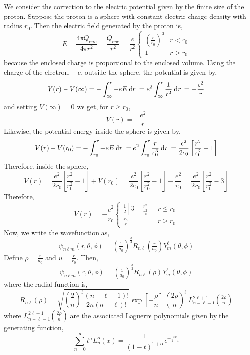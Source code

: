 \documentclass[12pt]{extarticle}
\begin{document}
We consider the correction to the electric potential given by the finite size of the proton. Suppose the proton is a sphere with constant electric charge density with radius $r_0$. Then the electric field generated by the proton is,
\[E = \frac{4 \pi Q_{enc}}{4 \pi r^2} = \frac{Q_{enc}}{r^2} = \frac{e}{r^2}
\begin{cases}
\left(\frac{r}{r_0} \right)^3 & r < r_0 \\
1 & r > r_0
\end{cases}\]
because the enclosed charge is proportional to the enclosed volume. Using the charge of the electron, $-e$, outside the sphere, the potential is given by,
\[ V(r) - V(\infty) = - \int_{\infty}^{r} -e E \: \mathrm{d}r \: = e^2 \int_{\infty}^r \frac{1}{r^2} \: \mathrm{d}r \: = - \frac{e^2}{r}\]
and setting $V(\infty) = 0$ we get, for $r \ge r_0$,
\[V(r) = - \frac{e^2}{r}\]
Likewise, the potential energy inside the sphere is given by,
\[V(r) - V(r_0) = - \int_{r_0}^{r} -e E \: \mathrm{d}r \: = e^2 \int_{r_0}^r \frac{r}{r_0^3} \: \mathrm{d}r \: = \frac{e^2}{2r_0} \left[\frac{r^2}{r_0^2} - 1 \right] \]
Therefore, inside the sphere, 
\[ V(r) = \frac{e^2}{2r_0} \left[\frac{r^2}{r_0^2} - 1 \right] + V(r_0) = \frac{e^2}{2r_0} \left[\frac{r^2}{r_0^2} - 1 \right]  - \frac{e^2}{r_0} = \frac{e^2}{2r_0} \left[\frac{r^2}{r_0^2} - 3 \right] \]
Therefore,
\[V(r) = - \frac{e^2}{r_0}
\begin{cases}
\frac{1}{2} \left[3 - \frac{r^2}{r_0^2} \right] & r \le r_0 \\
\frac{r_0}{r} & r \ge r_0
\end{cases}\]
Now, we write the wavefunction as,
\[ \psi_{n \ell m}(r, \theta, \phi) = \left(\tfrac{1}{a_0} \right)^{\frac{3}{2}} R_{n \ell}\left(\tfrac{r}{a_0} \right) Y^{\ell}_m (\theta, \phi) \]
Define $\rho = \frac{r}{a_0}$ and $u = \frac{r}{r_0}$. Then,
\[ \psi_{n \ell m}(r, \theta, \phi) = \left(\tfrac{1}{a_0} \right)^{\frac{3}{2}} R_{n \ell}(\rho) Y^{\ell}_m (\theta, \phi)\]
where the radial function is,
\[R_{n \ell}(\rho) = \sqrt{\left(\frac{2}{n}\right)^3 \frac{(n - \ell - 1)!}{2n (n + \ell)!}} \exp{\left[-\frac{\rho}{n}\right]} \: \left(\frac{2 \rho}{n} \right)^\ell \: L^{2\ell + 1}_{n - \ell - 1}\left(\tfrac{2 \rho}{n} \right) \]
where $L^{2\ell + 1}_{n - \ell - 1}\left(\tfrac{2 \rho}{n} \right)$ are the associated Laguerre polynomials given by the generating function,
\[\sum_{n = 0}^{\infty} t^n L^{\alpha}_{n} \left( x \right) = \frac{1}{(1 - t)^{1 + \alpha}} e^{-\frac{tx}{1 - t}} \]
\end{document}
